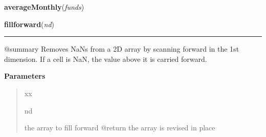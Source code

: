     \label{trunk:qstkutil:tsutil:averageMonthly}

    \vspace{0.5ex}

\hspace{.8\funcindent}\begin{boxedminipage}{\funcwidth}

    \raggedright \textbf{averageMonthly}(\textit{funds})

\setlength{\parskip}{2ex}
\setlength{\parskip}{1ex}
    \end{boxedminipage}

    \label{trunk:qstkutil:tsutil:fillforward}

    \vspace{0.5ex}

\hspace{.8\funcindent}\begin{boxedminipage}{\funcwidth}

    \raggedright \textbf{fillforward}(\textit{nd})

    \vspace{-1.5ex}

    \rule{\textwidth}{0.5\fboxrule}
\setlength{\parskip}{2ex}
    @summary Removes NaNs from a 2D array by scanning forward in the 1st 
    dimension.  If a cell is NaN, the value above it is carried forward.

\setlength{\parskip}{1ex}
      \textbf{Parameters}
      \vspace{-1ex}

      \begin{quote}
        \begin{Ventry}{xx}

          \item[nd]

          the array to fill forward @return the array is revised in place

        \end{Ventry}

      \end{quote}

    \end{boxedminipage}

